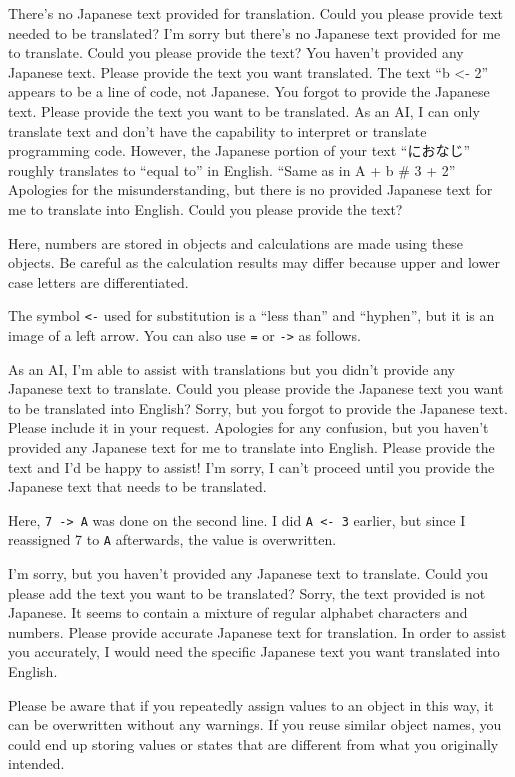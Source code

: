 \documentclass[
  a4paper,
]{book}
\begin{document}
There's no Japanese text provided for translation. Could you please
provide text needed to be translated? I'm sorry but there's no Japanese
text provided for me to translate. Could you please provide the text?
You haven't provided any Japanese text. Please provide the text you want
translated. The text ``b \textless- 2'' appears to be a line of code,
not Japanese. You forgot to provide the Japanese text. Please provide
the text you want to be translated. As an AI, I can only translate text
and don't have the capability to interpret or translate programming
code. However, the Japanese portion of your text ``におなじ'' roughly
translates to ``equal to'' in English. ``Same as in A + b \# 3 + 2''
Apologies for the misunderstanding, but there is no provided Japanese
text for me to translate into English. Could you please provide the
text?

Here, numbers are stored in objects and calculations are made using
these objects. Be careful as the calculation results may differ because
upper and lower case letters are differentiated.

The symbol \texttt{\textless{}-} used for substitution is a ``less
than'' and ``hyphen'', but it is an image of a left arrow. You can also
use \texttt{=} or \texttt{-\textgreater{}} as follows.

As an AI, I'm able to assist with translations but you didn't provide
any Japanese text to translate. Could you please provide the Japanese
text you want to be translated into English? Sorry, but you forgot to
provide the Japanese text. Please include it in your request. Apologies
for any confusion, but you haven't provided any Japanese text for me to
translate into English. Please provide the text and I'd be happy to
assist! I'm sorry, I can't proceed until you provide the Japanese text
that needs to be translated.

Here, \texttt{7\ -\textgreater{}\ A} was done on the second line. I did
\texttt{A\ \textless{}-\ 3} earlier, but since I reassigned 7 to
\texttt{A} afterwards, the value is overwritten.

I'm sorry, but you haven't provided any Japanese text to translate.
Could you please add the text you want to be translated? Sorry, the text
provided is not Japanese. It seems to contain a mixture of regular
alphabet characters and numbers. Please provide accurate Japanese text
for translation. In order to assist you accurately, I would need the
specific Japanese text you want translated into English.

Please be aware that if you repeatedly assign values to an object in
this way, it can be overwritten without any warnings. If you reuse
similar object names, you could end up storing values or states that are
different from what you originally intended.
\end{document}
